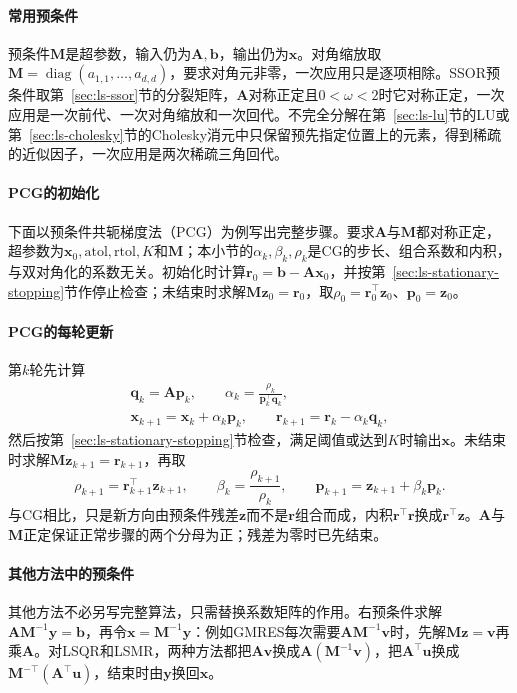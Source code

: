 \paragraph{常用预条件}
预条件$\bm M$是超参数，输入仍为$\bm A,\bm b$，输出仍为$\bm x$。对角缩放取$\bm M=\operatorname{diag}(a_{1,1},\ldots,a_{d,d})$，要求对角元非零，一次应用只是逐项相除。SSOR预条件取第~\ref{sec:ls-ssor}节的分裂矩阵，$\bm A$对称正定且$0<\omega<2$时它对称正定，一次应用是一次前代、一次对角缩放和一次回代。不完全分解在第~\ref{sec:ls-lu}节的LU或第~\ref{sec:ls-cholesky}节的Cholesky消元中只保留预先指定位置上的元素，得到稀疏的近似因子，一次应用是两次稀疏三角回代。

\paragraph{PCG的初始化}
下面以预条件共轭梯度法（PCG）为例写出完整步骤。要求$\bm A$与$\bm M$都对称正定，超参数为$\bm x_0,\mathrm{atol},\mathrm{rtol},K$和$\bm M$；本小节的$\alpha_k,\beta_k,\rho_k$是CG的步长、组合系数和内积，与双对角化的系数无关。初始化时计算$\bm r_0=\bm b-\bm A\bm x_0$，并按第~\ref{sec:ls-stationary-stopping}节作停止检查；未结束时求解$\bm M\bm z_0=\bm r_0$，取$\rho_0=\bm r_0^\top\bm z_0$、$\bm p_0=\bm z_0$。

\paragraph{PCG的每轮更新}
第$k$轮先计算
\[
 \begin{gathered}
 \bm q_k=\bm A\bm p_k,\qquad \alpha_k=\frac{\rho_k}{\bm p_k^\top\bm q_k},\\
 \bm x_{k+1}=\bm x_k+\alpha_k\bm p_k,\qquad \bm r_{k+1}=\bm r_k-\alpha_k\bm q_k ,
 \end{gathered}
\]
然后按第~\ref{sec:ls-stationary-stopping}节检查，满足阈值或达到$K$时输出$\bm x$。未结束时求解$\bm M\bm z_{k+1}=\bm r_{k+1}$，再取
\[
 \rho_{k+1}=\bm r_{k+1}^\top\bm z_{k+1},\qquad
 \beta_k=\frac{\rho_{k+1}}{\rho_k},\qquad
 \bm p_{k+1}=\bm z_{k+1}+\beta_k\bm p_k .
\]
与CG相比，只是新方向由预条件残差$\bm z$而不是$\bm r$组合而成，内积$\bm r^\top\bm r$换成$\bm r^\top\bm z$。$\bm A$与$\bm M$正定保证正常步骤的两个分母为正；残差为零时已先结束。

\paragraph{其他方法中的预条件}
其他方法不必另写完整算法，只需替换系数矩阵的作用。右预条件求解$\bm A\bm M^{-1}\bm y=\bm b$，再令$\bm x=\bm M^{-1}\bm y$：例如GMRES每次需要$\bm A\bm M^{-1}\bm v$时，先解$\bm M\bm z=\bm v$再乘$\bm A$。对LSQR和LSMR，两种方法都把$\bm A\bm v$换成$\bm A(\bm M^{-1}\bm v)$，把$\bm A^\top\bm u$换成$\bm M^{-\top}(\bm A^\top\bm u)$，结束时由$\bm y$换回$\bm x$。

